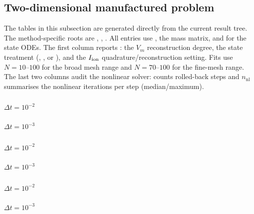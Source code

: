 \subsection{Two-dimensional manufactured problem}
\label{sec:en-results-2d}
The tables in this subsection are generated directly from the
current  result tree. The method-specific roots are , , .
All entries use , the  mass matrix, and  for the state ODEs.
The first column reports : the $V_m$ reconstruction degree, the state treatment (, , or ), and the $I_{\mathrm{ion}}$ quadrature/reconstruction setting.
Fits use $N=10$--$100$ for the broad mesh range and $N=70$--$100$ for the fine-mesh range.
The last two columns audit the nonlinear solver:  counts rolled-back steps and $n_{\mathrm{nl}}$ summarises the nonlinear iterations per step (median/maximum).

\subsubsection{}
\paragraph{$\Delta t=10^{-2}$}

\paragraph{$\Delta t=10^{-3}$}


\subsubsection{}
\paragraph{$\Delta t=10^{-2}$}

\paragraph{$\Delta t=10^{-3}$}


\subsubsection{}
\paragraph{$\Delta t=10^{-2}$}

\paragraph{$\Delta t=10^{-3}$}


